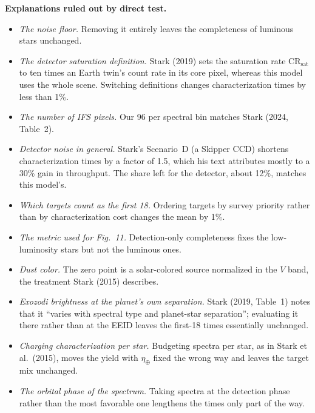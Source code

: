 \documentclass[11pt,a4paper]{article}
\begin{document}
\textbf{Explanations ruled out by direct test.}
\begin{itemize}
\item \emph{The noise floor.} Removing it entirely leaves the completeness of luminous stars
unchanged.
\item \emph{The detector saturation definition.} Stark (2019) sets the saturation rate
$\mathrm{CR_{sat}}$ to ten times an Earth twin's count rate in its core pixel, whereas this model
uses the whole scene. Switching definitions changes characterization times by less than 1\%.
\item \emph{The number of IFS pixels.} Our 96 per spectral bin matches Stark (2024, Table~2).
\item \emph{Detector noise in general.} Stark's Scenario~D (a Skipper CCD) shortens
characterization times by a factor of 1.5, which his text attributes mostly to a 30\% gain in
throughput. The share left for the detector, about 12\%, matches this model's.
\item \emph{Which targets count as the first 18.} Ordering targets by survey priority rather than
by characterization cost changes the mean by 1\%.
\item \emph{The metric used for Fig.~11.} Detection-only completeness fixes the low-luminosity stars
but not the luminous ones.
\item \emph{Dust color.} The zero point is a solar-colored source normalized in the $V$ band, the
treatment Stark (2015) describes.
\item \emph{Exozodi brightness at the planet's own separation.} Stark (2019, Table~1) notes that it
``varies with spectral type and planet-star separation''; evaluating it there rather than at the
EEID leaves the first-18 times essentially unchanged.
\item \emph{Charging characterization per star.} Budgeting spectra per star, as in Stark et al.\
(2015), moves the yield with $\eta_\oplus$ fixed the wrong way and leaves the target mix unchanged.
\item \emph{The orbital phase of the spectrum.} Taking spectra at the detection phase rather than
the most favorable one lengthens the times only part of the way.
\end{itemize}
\end{document}
